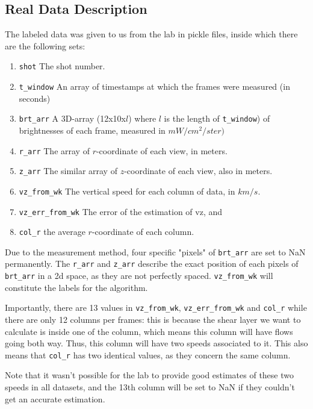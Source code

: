 \documentclass[10pt,conference]{IEEEtran}
\begin{document}
\subsection{Real Data Description}
The labeled data was given to us from the lab in pickle files, inside which there are the following sets:
\begin{enumerate}
  \item \texttt{shot} The shot number.
  \item \texttt{t\_window} An array of timestamps at which the frames were measured (in seconds)
  \item \texttt{brt\_arr} A 3D-array (12x10x$l$) where $l$ is the length of \texttt{t\_window}) of brightnesses of each frame, measured in $mW/cm^2/ster)$
  \item \texttt{r\_arr} The array of $r$-coordinate of each view, in meters.
  \item \texttt{z\_arr}  The similar array of $z$-coordinate of each view, also in meters.
  \item \texttt{vz\_from\_wk} The vertical speed for each column of data, in $km/s$.
  \item \texttt{vz\_err\_from\_wk} The error of the estimation of vz, and
  \item \texttt{col\_r} the average $r$-coordinate of each column.
\end{enumerate}
Due to the measurement method, four specific "pixels" of \texttt{brt\_arr} are set to NaN permanently. The \texttt{r\_arr} and \texttt{z\_arr} describe the exact position of each pixels of \texttt{brt\_arr} in a 2d space, as they are not perfectly spaced. \texttt{vz\_from\_wk} will constitute the labels for the algorithm.\par
Importantly, there are 13 values in \texttt{vz\_from\_wk}, \texttt{vz\_err\_from\_wk} and \texttt{col\_r} while there are only 12 columns per frames: this is because the shear layer we want to calculate is inside one of the column, which means this column will have flows going both way. Thus, this column will have two speeds associated to it. This also means that \texttt{col\_r} has two identical values, as they concern the same column.\par
Note that it wasn't possible for the lab to provide good estimates of these two speeds in all datasets, and the 13th column will be set to NaN if they couldn't get an accurate estimation. 
\end{document}
